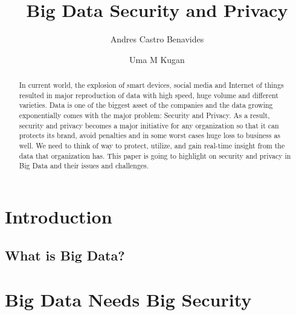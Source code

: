 \documentclass[sigconf]{acmart}
\begin{document}
\title{Big Data Security and Privacy}

\author{Andres Castro Benavides}

\author{Uma M Kugan}
\renewcommand{\shortauthors}{Uma}

\begin{abstract}
In current world, the explosion of smart devices, social media and Internet of things resulted in major reproduction of data with high speed, huge volume and different varieties. Data is one of the biggest asset of the companies and the data growing exponentially comes with the major problem: Security and Privacy. As a result, security and privacy becomes a major initiative for any organization so that it can protects its brand, avoid penalties and in some worst cases huge loss to business as well. We need to think of way to protect, utilize, and gain real-time insight from the data that organization has. This paper is going to highlight on security and privacy in Big Data and their issues and challenges. 
\end{abstract}


\maketitle

\section{Introduction}

\subsection{What is Big Data?}

\section{Big Data Needs Big Security}
\end{document}
